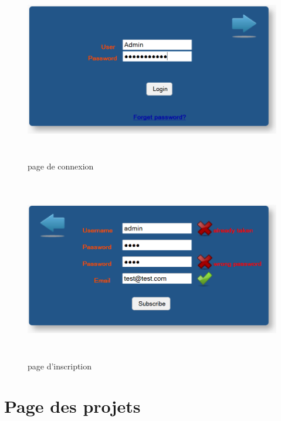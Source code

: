 \begin{figure}[!h]
	\begin{center}
		\includegraphics[width=16cm,height=8cm]{login.png}	
		\caption{page de connexion}
	\end{center}
\end{figure}

\begin{figure}[!h]
	\begin{center}
		\includegraphics[width=16cm,height=8cm]{subscribe.png}
		\caption{page d'inscription}
	\end{center}
\end{figure}

\newpage

\section{Page des projets}
\label{annexe/espace_nom}

